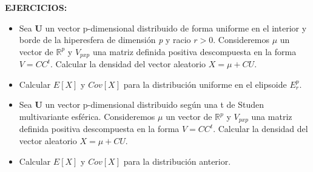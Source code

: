\documentclass{article}
\theoremstyle{theorem-style}  %
\theoremstyle{definition}
\theoremstyle{example-style}
\begin{document}
	\textbf{EJERCICIOS:}
	\begin{itemize}
		\item Sea \textbf{U} un vector p-dimensional distribuido de forma uniforme en el interior y borde de la hiperesfera de dimensión \textit{p} y racio $r>0.$ Consideremos $\mu$ un vector de $\mathbb{R}^p$ y $V_{pxp}$ una matriz definida positiva descompuesta en la forma $V=CC^t$. Calcular la densidad del vector aleatorio $X=\mu+CU$.
		
		\item Calcular $E[X]$ y $Cov[X]$ para la distribución uniforme en el elipsoide $E^p_r$.
		
		\item Sea \textbf{U} un vector p-dimensional distribuido según una t de Studen multivariante esférica. Consideremos $\mu$ un vector de $\mathbb{R}^p$ y $V_{pxp}$ una matriz definida positiva descompuesta en la forma $V=CC^t$. Calcular la densidad del vector aleatorio $X=\mu+CU$. 
		
		\item Calcular $E[X]$ y $Cov[X]$ para la distribución anterior.
	\end{itemize}
	
\end{document}
